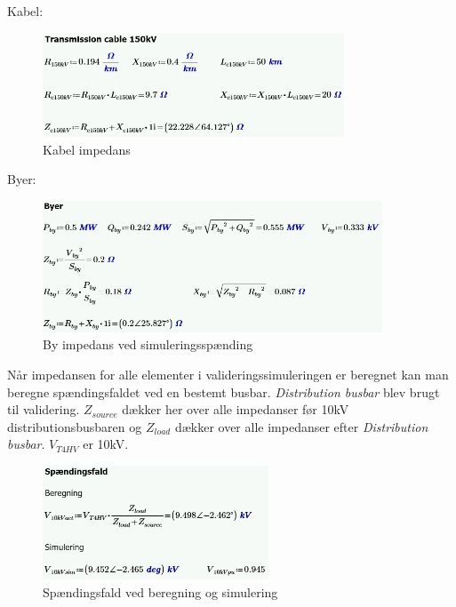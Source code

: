 Kabel:
\begin{figure}[H] %
	\centering
	\includegraphics[width=0.8\textwidth]{figurer/Kabel_validering}
	\caption{Kabel impedans}
	\label{fig:Kabelimpedans}
\end{figure}

Byer:
\begin{figure}[H] %
	\centering
	\includegraphics[width=0.9\textwidth]{figurer/By_validering}
	\caption{By impedans ved simuleringsspænding}
	\label{fig:Byimpedans}
\end{figure}

 Når impedansen for alle elementer i valideringssimuleringen er beregnet kan man beregne spændingsfaldet ved en bestemt busbar. \textit{Distribution busbar} blev brugt til validering. $Z_{source}$ dækker her over alle impedanser før 10kV distributionsbusbaren og $Z_{load}$ dækker over alle impedanser efter \textit{Distribution busbar}. $V_{T4HV}$ er 10kV.
 
 \begin{figure}[H] %
 	\centering
 	\includegraphics[width=0.6\textwidth]{figurer/Spaendingsfald_validering}
 	\caption{Spændingsfald ved beregning og simulering}
 	\label{fig:Spaendingsfald_validering}
 \end{figure}
 
